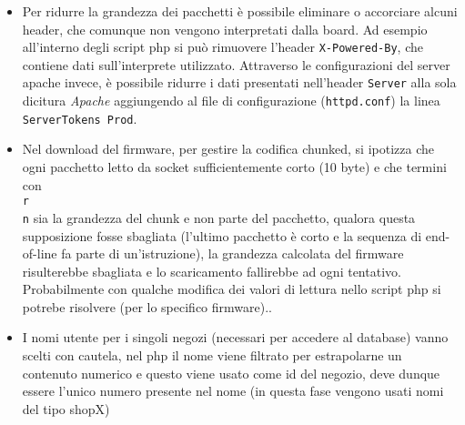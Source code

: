 \begin{itemize}
\item Per ridurre la grandezza dei pacchetti \`e possibile eliminare o accorciare alcuni header, che comunque non vengono interpretati dalla board. Ad esempio all'interno degli script php si pu\`o rimuovere l'header \texttt{X-Powered-By}, che contiene dati sull'interprete utilizzato. Attraverso le configurazioni del server apache invece, \`e possibile ridurre i dati presentati nell'header \texttt{Server} alla sola dicitura \textit{Apache} aggiungendo al file di configurazione (\texttt{httpd.conf}) la linea \texttt{ServerTokens Prod}.
\item Nel download del firmware, per gestire la codifica chunked, si ipotizza che ogni pacchetto letto da socket sufficientemente corto (10 byte) e che termini con \texttt{\\r\\n} sia la grandezza del chunk e non parte del pacchetto, qualora questa supposizione fosse sbagliata (l'ultimo pacchetto \`e corto e la sequenza di end-of-line fa parte di un'istruzione), la grandezza calcolata del firmware risulterebbe sbagliata e lo scaricamento fallirebbe ad ogni tentativo. Probabilmente con qualche modifica dei valori di lettura nello script php si potrebe risolvere (per lo specifico firmware)..
\item I nomi utente per i singoli negozi (necessari per accedere al database) vanno scelti con cautela, nel php il nome viene filtrato per estrapolarne un contenuto numerico e questo viene usato come id del negozio, deve dunque essere l'unico numero presente nel nome (in questa fase vengono usati nomi del tipo shopX)
\end{itemize}
